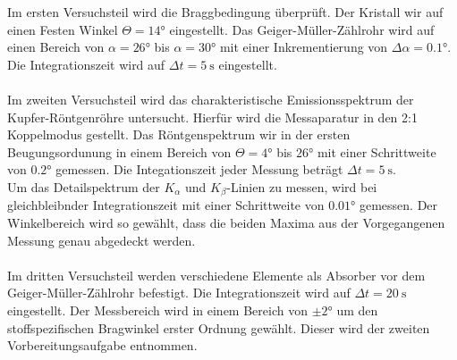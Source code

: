 Im ersten Versuchsteil wird die Braggbedingung überprüft. Der Kristall wir auf einen Festen Winkel $Θ = 14°$ eingestellt.
Das Geiger-Müller-Zählrohr wird auf einen Bereich von $α = 26°$ bis $α = 30°$ mit einer Inkrementierung von $Δα = 0.1°$. Die Integrationszeit wird auf $Δt = \SI{5}{\second}$ eingestellt.\\
\\
Im zweiten Versuchsteil wird das charakteristische Emissionsspektrum der Kupfer-Röntgenröhre untersucht. Hierfür wird die Messaparatur in den 2:1 Koppelmodus
gestellt. Das Röntgenspektrum wir in der ersten Beugungsordunung in einem Bereich von $Θ = 4°$ bis $26°$ mit einer Schrittweite von $0.2°$ gemessen. Die Integationszeit jeder Messung beträgt $Δt = \SI{5}{\second}$.\\
Um das Detailspektrum der $K_α$ und $K_β$-Linien zu messen, wird bei gleichbleibnder Integrationszeit mit einer Schrittweite von $0.01°$ gemessen. Der Winkelbereich wird so gewählt, dass die beiden Maxima aus der Vorgegangenen Messung
genau abgedeckt werden.\\
\\
Im dritten Versuchsteil werden verschiedene Elemente als Absorber vor dem Geiger-Müller-Zählrohr befestigt. Die Integrationszeit wird auf $Δt = \SI{20}{\second}$ eingestellt.
Der Messbereich wird in einem Bereich von $\pm2°$ um den stoffspezifischen Bragwinkel erster Ordnung gewählt. Dieser wird der zweiten Vorbereitungsaufgabe entnommen.\\